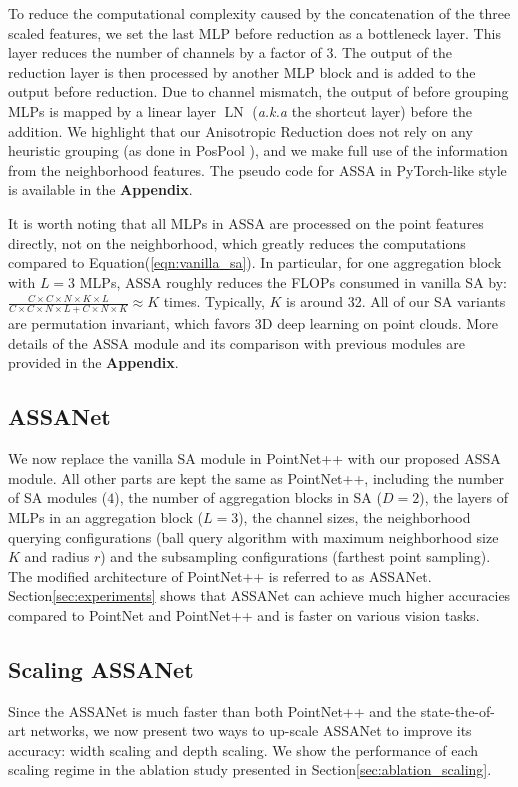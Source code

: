 \documentclass{article}
\newcommand{\eqnLabel}{Equation\xspace}
\newcommand{\eqnref}[1]{(\ref{#1})}
\newcommand{\secLabel}{Section\xspace}
\newcommand{\supp}{\textbf{Appendix}\xspace}
\begin{document}
To reduce the computational complexity caused by the concatenation of the three scaled features, we set the last MLP before reduction as a bottleneck layer. This layer reduces the number of channels by a factor of $3$. The output of the reduction layer is then processed by another MLP block and is added to the output before reduction. Due to channel mismatch, the output of before grouping MLPs is mapped by a linear layer $\operatorname{LN}$ (\textit{a.k.a} the shortcut layer) before the addition. We highlight that our Anisotropic Reduction does not rely on any heuristic grouping (as done in PosPool \cite{Liu2020ACL}), and we make full use of the information from the neighborhood features. The pseudo code for ASSA in PyTorch-like style is available in the \supp. 

It is worth noting that all MLPs in ASSA are processed on the point features directly, not on the neighborhood, which greatly reduces the computations compared to \eqnLabel \eqnref{eqn:vanilla_sa}. 
In particular, for one aggregation block with $L=3$ MLPs, ASSA roughly reduces the FLOPs consumed in vanilla SA by: $\frac{C\times C \times N \times K \times L}{C\times C \times N \times L + C \times N \times K } \approx K$ times. Typically, $K$ is around 32. All of our SA variants are permutation invariant, which favors 3D deep learning on point clouds. More details of the ASSA module and its comparison with previous modules are provided in the \supp. 


\subsection{ASSANet}
We now replace the vanilla SA module in PointNet++ \cite{Qi2017PointNetDH} with our proposed ASSA module. All other parts are kept the same as PointNet++, including the number of SA modules ($4$), the number of aggregation blocks in SA ($D=2$), the layers of MLPs in an aggregation block ($L=3$), the channel sizes, the neighborhood querying configurations (ball query algorithm with maximum neighborhood size $K$ and radius $r$) and the subsampling configurations (farthest point sampling). The modified architecture of PointNet++ is referred to as ASSANet. \secLabel \ref{sec:experiments} shows that ASSANet can achieve much higher accuracies compared to PointNet and PointNet++ and is faster on various vision tasks.

\subsection{Scaling ASSANet}
Since the ASSANet is much faster than both PointNet++ \cite{Qi2017PointNetDH} and the state-the-of-art networks, we now present two ways to up-scale ASSANet to improve its accuracy: width scaling and depth scaling. We show the performance of each scaling regime in the ablation study presented in \secLabel \ref{sec:ablation_scaling}. 
\end{document}
